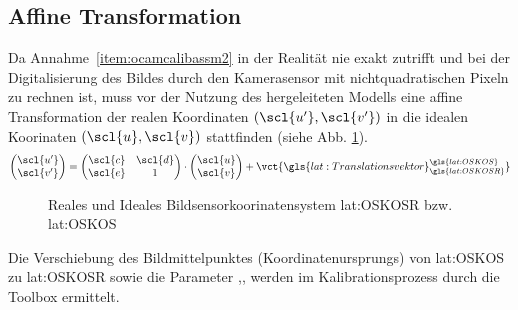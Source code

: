 \subsection{Affine Transformation}
Da Annahme~\ref{item:ocamcalibassm2} in der Realität nie exakt zutrifft und bei der Digitalisierung des Bildes durch den Kamerasensor mit nichtquadratischen Pixeln zu rechnen ist, muss vor der Nutzung des hergeleiteten Modells eine affine Transformation der realen Koordinaten \((\scl{u'}, \scl{v'})\) in die idealen Koorinaten \((\scl{u}, \scl{v})\) stattfinden (siehe Abb. \ref{fig:kameramodell:affin}).
\begin{equation}
\begin{pmatrix}
\scl{u'} \\ \scl{v'}
\end{pmatrix}
=
\begin{pmatrix}
\scl{c} & \scl{d} \\
\scl{e} & 1 
\end{pmatrix}
\cdot
\begin{pmatrix}
\scl{u} \\ \scl{v}
\end{pmatrix}
+
\vct{\gls{lat:Translationsvektor}^{\gls{lat:OSKOS}}_{\gls{lat:OSKOSR}}}
\end{equation}
\begin{figure}[H]
\centering
{}
\qquad
{}
\caption{Reales und Ideales Bildsensorkoorinatensystem \gls{lat:OSKOSR} bzw. \gls{lat:OSKOS}}
\label{fig:kameramodell:affin}
\end{figure}
 Die Verschiebung des Bildmittelpunktes (Koordinatenursprungs) von \gls{lat:OSKOS} zu \gls{lat:OSKOSR}  sowie die Parameter ,, werden im Kalibrationsprozess durch die Toolbox ermittelt.


